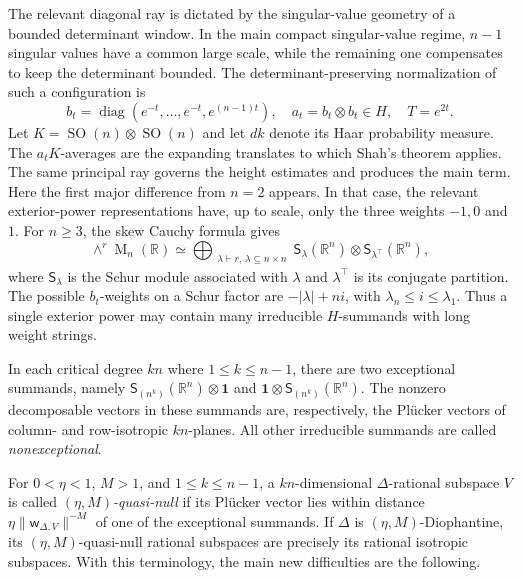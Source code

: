 \documentclass[reqno,11pt]{amsart}
\numberwithin{equation}{section}
\theoremstyle{definition}
\theoremstyle{remark}
\newcommand{\op}{\operatorname}
\newcommand{\SO}{\op{SO}}
\newcommand{\M}{\op{M}}
\begin{document}
The relevant diagonal ray is dictated by the singular-value geometry of a
bounded determinant window.  In the main compact singular-value
regime, $n-1$ singular values have a common large scale, while the remaining
one compensates to keep the determinant bounded. The determinant-preserving
normalization of such a  configuration is
$$
b_t=\operatorname{diag}(e^{-t},\ldots,e^{-t},e^{(n-1)t}),
\quad
a_t=b_t\otimes b_t\in H,\quad  T= e^{2t} .
$$
Let $K=\SO(n)\otimes\SO(n)$ and let $dk$ denote its  Haar probability measure. The $a_tK$-averages are the expanding translates to which Shah's
theorem applies. The same principal ray governs the height estimates and
produces the main term. 
Here the first major difference from $n=2$ appears. In that case, the relevant exterior-power representations have, up to scale, only the three weights $-1,0$ and $1$.
 For $n\ge3$, the skew
Cauchy formula gives
$$
\wedge^r\M_n(\mathbb R)
\simeq
\bigoplus_{\substack{\lambda\vdash r,\, 
\lambda\subseteq n\times n}}
{\mathsf S}_\lambda(\mathbb R^n)\otimes
{\mathsf S}_{\lambda^{\intercal}}(\mathbb R^n),
$$
where ${\mathsf S}_\lambda$ is the Schur module associated with $\lambda$
and $\lambda^{\intercal}$ is its conjugate partition.  The possible $b_t$-weights on a Schur factor are 
$-|\lambda|+ni$, with $\lambda_n\le i\le\lambda_1$. Thus a single exterior power may contain many irreducible $H$-summands with long weight
strings. 


In each critical degree $kn$ where
$1\le k\le n-1$, there are two exceptional summands, namely
$
{\mathsf S}_{(n^k)}(\mathbb R^n)\otimes\mathbf 1$ and
$\mathbf 1\otimes {\mathsf S}_{(n^k)}(\mathbb R^n).
$
The nonzero decomposable vectors in these summands are, respectively, the Pl\"ucker vectors of
column- and row-isotropic $kn$-planes. 
All other irreducible summands are called \emph{nonexceptional}.

For $0<\eta<1$, $M>1$, and $1\le k\le n-1$, a $kn$-dimensional $\Delta$-rational subspace
$V$ is called \emph{$(\eta,M)$-quasi-null} if its Pl\"ucker vector lies within distance
$\eta\|\mathsf w_{\Delta,V}\|^{-M}$ of one of the exceptional summands.
If $\Delta$ is $(\eta,M)$-Diophantine, its $(\eta,M)$-quasi-null
rational subspaces are precisely its rational isotropic subspaces. 
With this terminology, the main new difficulties are the following.
\end{document}
